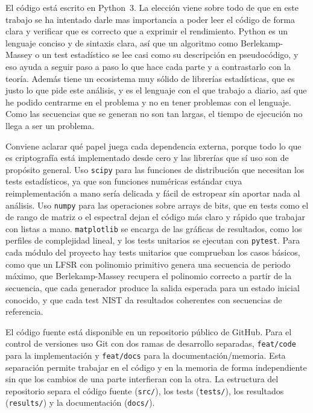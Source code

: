 El código está escrito en Python~3. La elección viene sobre todo de que en este trabajo se ha intentado darle mas importancia a poder leer el código
de forma clara y verificar que es correcto que a exprimir el rendimiento. Python es un lenguaje conciso y de sintaxis clara,
así que un algoritmo como Berlekamp-Massey o un test estadístico se lee casi como su descripción en pseudocódigo,
y eso ayuda a seguir paso a paso lo que hace cada parte y a contrastarlo con la teoría.
Además tiene un ecosistema muy sólido de librerías estadísticas, que es justo lo que pide este análisis,
y es el lenguaje con el que trabajo a diario, así que he podido centrarme en el problema y no en tener problemas con el lenguaje.
Como las secuencias que se generan no son tan largas, el tiempo de ejecución no llega a ser un problema.

Conviene aclarar qué papel juega cada dependencia externa, porque todo lo que es criptografía está implementado desde cero
y las librerías que sí uso son de propósito general. Uso \texttt{scipy} para las funciones de distribución que necesitan los tests estadísticos,
ya que son funciones numéricas estándar cuya reimplementación a mano sería delicada y fácil de estropear sin aportar nada al análisis.
Uso \texttt{numpy} para las operaciones sobre arrays de bits, que en tests como el de rango de matriz o el espectral
dejan el código más claro y rápido que trabajar con listas a mano. \texttt{matplotlib} se encarga de las gráficas de resultados,
como los perfiles de complejidad lineal, y los tests unitarios se ejecutan con \texttt{pytest}.
Para cada módulo del proyecto hay tests unitarios que comprueban los casos básicos, como que un LFSR con polinomio primitivo genera una secuencia de periodo máximo,
que Berlekamp-Massey recupera el polinomio correcto a partir de la secuencia, que cada generador produce la salida esperada para un estado inicial conocido,
y que cada test NIST da resultados coherentes con secuencias de referencia.

El código fuente está disponible en un repositorio público de GitHub.
Para el control de versiones uso Git con dos ramas de desarrollo separadas, \texttt{feat/code} para la implementación
y \texttt{feat/docs} para la documentación/memoria. Esta separación permite trabajar en el código y en la memoria de forma independiente
sin que los cambios de una parte interfieran con la otra. La estructura del repositorio separa el código fuente (\texttt{src/}),
los tests (\texttt{tests/}), los resultados (\texttt{results/}) y la documentación (\texttt{docs/}).

